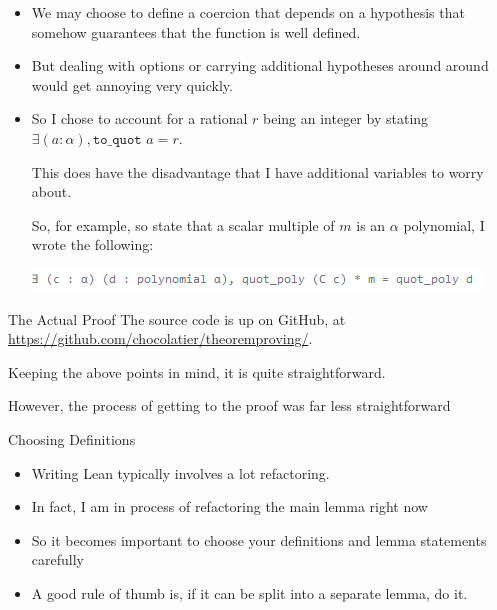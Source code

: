 \documentclass{beamer}
\begin{document}
\begin{frame}
  \begin{itemize}
    \item We may choose to define a coercion that depends on a hypothesis that somehow guarantees that the function is well defined. 
    \item But dealing with options or carrying additional hypotheses around around would get annoying very quickly.
    \item So I chose to account for a rational $r$ being an integer by stating 
    $\exists(a : \alpha), \texttt{to\_quot } a = r$. 

    This does have the disadvantage that I have additional variables to worry about. 

    So, for example, so state that a scalar multiple of $m$ is an $\alpha$ polynomial, I wrote the following:

    \includegraphics[width=\textwidth]{exists.png}


  \end{itemize}

\end{frame}

\begin{frame}{The Actual Proof}
    The source code is up on GitHub, at \url{https://github.com/chocolatier/theoremproving/}. 
    
    Keeping the above points in mind, it is quite straightforward. 

    However, the process of getting to the proof was far less straightforward

\end{frame}


\begin{frame}{Choosing Definitions}
  \begin{itemize}
    \item Writing Lean typically involves a lot refactoring. 
    \item In fact, I am in process of refactoring the main lemma right now
    \item So it becomes important to choose your definitions and lemma statements carefully 
    \item A good rule of thumb is, if it can be split into a separate lemma, do it. 
  \end{itemize}
\end{frame}
\end{document}
